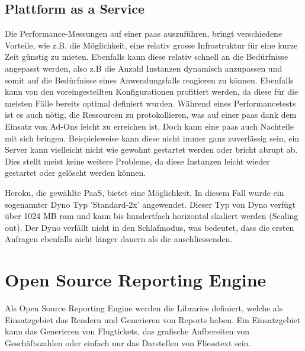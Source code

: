 \documentclass[main.tex]{subfiles}
\begin{document}
\subsection{Plattform as a Service}

Die Performance-Messungen auf einer \acrshort{paas} auszuführen, bringt verschiedene Vorteile, wie z.B. die Möglichkeit, eine relativ grosse Infrastruktur für eine kurze Zeit günstig zu mieten. Ebenfalls kann diese relativ schnell an die Bedürfnisse angepasst werden, also z.B die Anzahl Instanzen dynamisch anzupassen und somit auf die Bedürfnisse eines Anwendungsfalls reagieren zu können. Ebenfalls kann von den voreingestellten Konfigurationen profitiert werden, da diese für die meisten Fälle bereits optimal definiert wurden. Während eines Performancetests ist es auch nötig, die Ressourcen zu protokollieren, was auf einer \acrshort{paas} dank dem Einsatz von Ad-Ons leicht zu erreichen ist. 
Doch kann eine \acrshort{paas} auch Nachteile mit sich bringen. Beispielsweise kann diese nicht immer ganz zuverlässig sein, ein Server kann vielleicht nicht wie gewohnt gestartet werden oder bricht abrupt ab. Dies stellt meist keine weitere Probleme, da diese Instanzen leicht wieder gestartet oder gelöscht werden können.\cite[Kap.~3]{molyneaux2014art} 


Heroku, die gewählte PaaS, bietet eine Möglichkeit. 
In diesem Fall wurde ein sogenannter Dyno Typ ’Standard-2x’ angewendet. Dieser Typ von Dyno verfügt über 1024 MB \gls{ram} und kann bis hundertfach horizontal skaliert werden (Scaling out). Der Dyno verfällt nicht in den Schlafmodus, was bedeutet, dass die ersten Anfragen ebenfalls nicht länger dauern als die anschliessenden. 



\section{Open Source Reporting Engine }



Als Open Source Reporting Engine werden die Libraries definiert, welche als Einsatzgebiet das Rendern und Generieren von Reports haben. Ein Einsatzgebiet kann das Generieren von Flugtickets, das grafische Aufbereiten von Geschäftszahlen oder einfach nur das Darstellen von Fliesstext sein.
\end{document}
